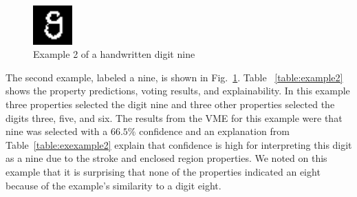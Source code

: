 \documentclass[conference]{IEEEtran}
\begin{document}
 \begin{figure}[htbp]
\centerline{\includegraphics[width=15mm]{./digit-images/9-9.png}}
\caption{Example 2 of a handwritten digit nine}
\label{example2}
\end{figure}


The second example,  labeled a nine, is shown in Fig.~\ref{example2}.  Table ~\ref{table:example2} shows the property predictions, voting results, and explainability.  In this example three properties selected the digit nine and three other properties selected the digits three, five, and six.  The results from the VME for this example were that nine was selected with a $66.5\%$ confidence and an explanation from Table~\ref{table:exexample2} explain that confidence is high for interpreting this digit as a nine due to the stroke and enclosed region properties.  We noted on this example that it is surprising that none of the properties indicated an eight because of the example's similarity to a digit eight.  
\end{document}
